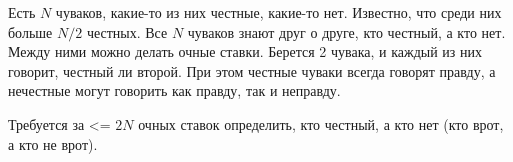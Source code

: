 \begin{problem}

Есть $N$ чуваков, какие-то из них честные, какие-то нет. Известно, что среди них больше $N/2$ честных. Все $N$ чуваков знают друг о друге, кто честный, а кто нет.
Между ними можно делать очные ставки. Берется 2 чувака, и каждый из них говорит, честный ли второй. При этом честные чуваки всегда говорят правду, а нечестные могут говорить как правду, так и неправду.

Требуется за <= $2N$ очных ставок определить, кто честный, а кто нет (кто врот, а кто не врот).
\end{problem}